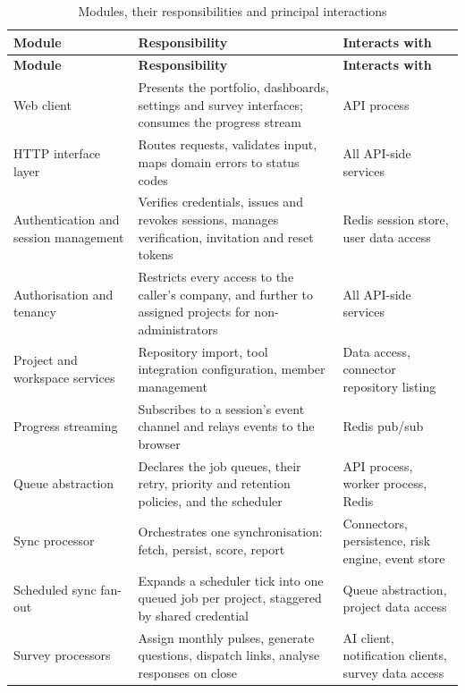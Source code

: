 \begin{longtable}{
  >{\raggedright\arraybackslash}p{}
  >{\raggedright\arraybackslash}p{}
  >{\raggedright\arraybackslash}p{}
}
\caption{Modules, their responsibilities and principal interactions}
\label{tab:modules}\\
\toprule
\textbf{Module} & \textbf{Responsibility} & \textbf{Interacts with} \\
\midrule
\endfirsthead
\toprule
\textbf{Module} & \textbf{Responsibility} & \textbf{Interacts with} \\
\midrule
\endhead
\bottomrule
\endlastfoot
Web client & Presents the portfolio, dashboards, settings and survey interfaces;
consumes the progress stream & API process \\
\addlinespace
HTTP interface layer & Routes requests, validates input, maps domain errors to status
codes & All API-side services \\
\addlinespace
Authentication and session management & Verifies credentials, issues and revokes
sessions, manages verification, invitation and reset tokens & Redis session store,
user data access \\
\addlinespace
Authorisation and tenancy & Restricts every access to the caller's company, and
further to assigned projects for non-administrators & All API-side services \\
\addlinespace
Project and workspace services & Repository import, tool integration configuration,
member management & Data access, connector repository listing \\
\addlinespace
Progress streaming & Subscribes to a session's event channel and relays events to the
browser & Redis pub/sub \\
\addlinespace
Queue abstraction & Declares the job queues, their retry, priority and retention
policies, and the scheduler & API process, worker process, Redis \\
\addlinespace
Sync processor & Orchestrates one synchronisation: fetch, persist, score, report &
Connectors, persistence, risk engine, event store \\
\addlinespace
Scheduled sync fan-out & Expands a scheduler tick into one queued job per project,
staggered by shared credential & Queue abstraction, project data access \\
\addlinespace
Survey processors & Assign monthly pulses, generate questions, dispatch links,
analyse responses on close & AI client, notification clients, survey data access \\

\end{longtable}
